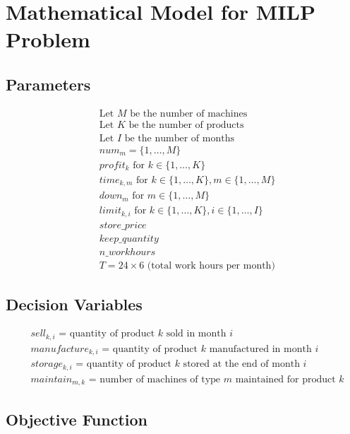 \documentclass{article}
\begin{document}
\section*{Mathematical Model for MILP Problem}

\subsection*{Parameters}

\begin{align*}
& \text{Let } M \text{ be the number of machines} \\
& \text{Let } K \text{ be the number of products} \\
& \text{Let } I \text{ be the number of months} \\
& num_m = \{1, \ldots, M\} \\
& profit_k \text{ for } k \in \{1, \ldots, K\} \\
& time_{k, m} \text{ for } k \in \{1, \ldots, K\}, m \in \{1, \ldots, M\} \\
& down_m \text{ for } m \in \{1, \ldots, M\} \\
& limit_{k, i} \text{ for } k \in \{1, \ldots, K\}, i \in \{1, \ldots, I\} \\
& store\_price \\
& keep\_quantity \\
& n\_workhours \\
& T = 24 \times 6 \text{ (total work hours per month)}
\end{align*}

\subsection*{Decision Variables}

\begin{align*}
& sell_{k, i} \text{ = quantity of product } k \text{ sold in month } i \\
& manufacture_{k, i} \text{ = quantity of product } k \text{ manufactured in month } i \\
& storage_{k, i} \text{ = quantity of product } k \text{ stored at the end of month } i \\
& maintain_{m, k} \text{ = number of machines of type } m \text{ maintained for product } k
\end{align*}

\subsection*{Objective Function}
\end{document}
